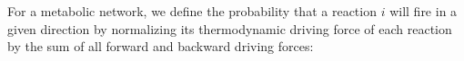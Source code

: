 For a metabolic network, we define the probability that a reaction $i$ will fire in a given direction by normalizing its thermodynamic driving force of each reaction by the sum of all forward and backward driving forces: